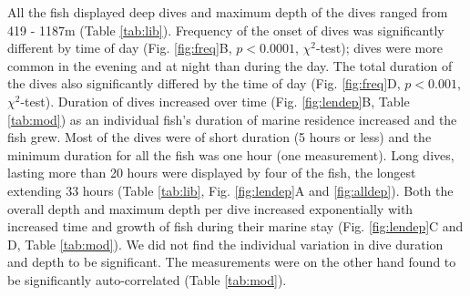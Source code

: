 All the fish displayed deep dives and maximum depth of the dives ranged from 419 - 1187m (Table \ref{tab:lib}). 
Frequency of the onset of dives was significantly different by time of day (Fig. \ref{fig:freq}B, $p < 0.0001$, $\chi^2$-test); dives were more common in the evening and at night than during the day. 
The total duration of the dives also significantly differed by the time of day (Fig. \ref{fig:freq}D, $p < 0.001$, $\chi^2$-test). 
Duration of dives increased over time (Fig. \ref{fig:lendep}B, Table \ref{tab:mod}) as an individual fish's duration of marine residence increased and the fish grew. 
Most of the dives were of short duration (5 hours or less) and the minimum duration for all the fish was one hour (one measurement). 
Long dives, lasting more than 20 hours were displayed by four of the fish, the longest extending 33 hours (Table \ref{tab:lib}, Fig. \ref{fig:lendep}A and \ref{fig:alldep}). 
Both the overall depth and maximum depth per dive increased exponentially with increased time and growth of fish during their marine stay (Fig. \ref{fig:lendep}C and D, Table \ref{tab:mod}).  We did not find the individual variation in dive duration and depth to be significant. The measurements were on the other hand found to be significantly auto-correlated (Table \ref{tab:mod}).

